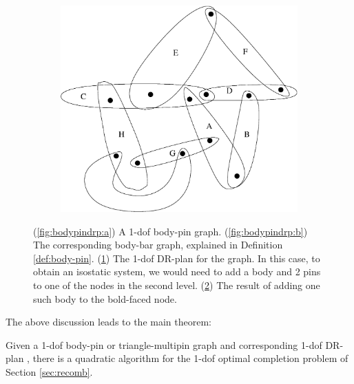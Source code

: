 \begin{figure}
\begin{subfigure}{0.35\linewidth}
        \caption{}\label{fig:bodypindrp:c}
    \end{subfigure}
    \hfill
    \begin{subfigure}{0.2\linewidth}\centering
        \includegraphics[height=\myMinHeight]{img/bodypin2}
        \caption{}\label{fig:bodypindrp:d}
    \end{subfigure}
    \caption{(\ref{fig:bodypindrp:a}) A 1-dof body-pin graph. (\ref{fig:bodypindrp:b}) The corresponding body-bar graph, explained in Definition \ref{def:body-pin}. (\ref{fig:bodypindrp:c}) The 1-dof DR-plan for the graph. In this case, to obtain an isostatic system, we would need to add a body and 2 pins to one of the nodes in the second level. (\ref{fig:bodypindrp:d}) The result of adding one such body to the bold-faced node.}
    \label{fig:bodypindrp}
\end{figure}

The above discussion leads to the main theorem:
\begin{theorem*}
\label{thm:1dofcase}
    Given a 1-dof body-pin or triangle-multipin graph  and corresponding 1-dof DR-plan , there is a quadratic algorithm for the 1-dof optimal completion problem of Section \ref{sec:recomb}.
\end{theorem*}


